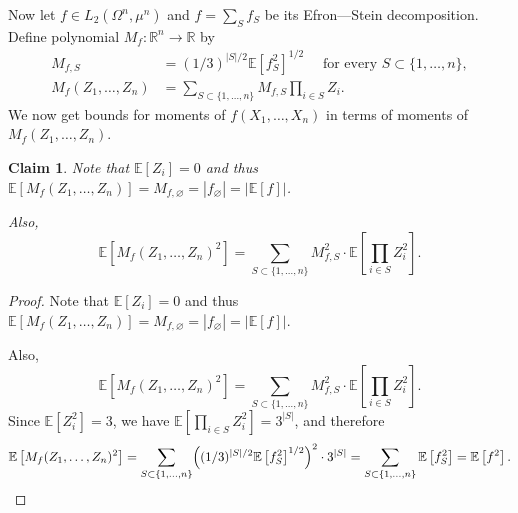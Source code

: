 \documentclass[11pt]{article}
\newcommand {\Exp}       {\mathbb{E}}
\newcommand {\E}     [1] {\Exp\left[#1\right]}
\newtheorem{claim}[theorem]{Claim}
\begin{document}
\noindent Now let $f \in L_2(\Omega^n, \mu^n)$ and $f = \sum_{S} f_S$ be its Efron---Stein decomposition. Define polynomial
$M_f\colon{\mathbb R}^n \to {\mathbb R}$ by
\begin{align*}
M_{f,S} &= (1/3)^{|S|/2} \E{f_S^2}^{1/2} \quad\text{ for every } S\subset \{1,\dots,n\},\\
M_f(Z_1,\dots, Z_n) &= \sum_{S\subset \{1,\dots,n\}} M_{f,S}\prod_{i\in S} Z_i.
\end{align*}
We now get bounds for moments of $f(X_1,\dots, X_n)$ in terms of moments of $M_f(Z_1,\dots,Z_n)$.
\begin{claim}\label{claim:second-moment}
Note that $\E{Z_i} = 0$ and thus $\E{M_f(Z_1,\dots,Z_n)} = M_{f,\varnothing} = |f_{\varnothing}| = |\E{f}|$.

Also,
$$\E{M_f(Z_1,\dots,Z_n)^2} = \sum_{S\subset \{1,\dots,n\}} M_{f,S}^2 \cdot \Exp[\prod_{i\in S}Z_i^2].$$
\end{claim}
\begin{proof}
Note that $\E{Z_i} = 0$ and thus $\E{M_f(Z_1,\dots,Z_n)} = M_{f,\varnothing} = |f_{\varnothing}| = |\E{f}|$.

Also,
$$\E{M_f(Z_1,\dots,Z_n)^2} = \sum_{S\subset \{1,\dots,n\}} M_{f,S}^2 \cdot \Exp[\prod_{i\in S}Z_i^2].$$
Since $\E{Z_i^2} = 3$, we have $\E{\prod_{i\in S}Z_i^2} = 3^{|S|}$, and therefore
$$\E{M_f(Z_1,\dots,Z_n)^2} = \sum_{S\subset \{1,\dots,n\}} \Bigl((1/3)^{|S|/2} \E{f_S^2}^{1/2}\Bigr)^2 \cdot 3^{|S|}= \sum_{S\subset \{1,\dots,n\}} \E{f_S^2} = \E{f^2}.$$
\end{proof}
\end{document}
